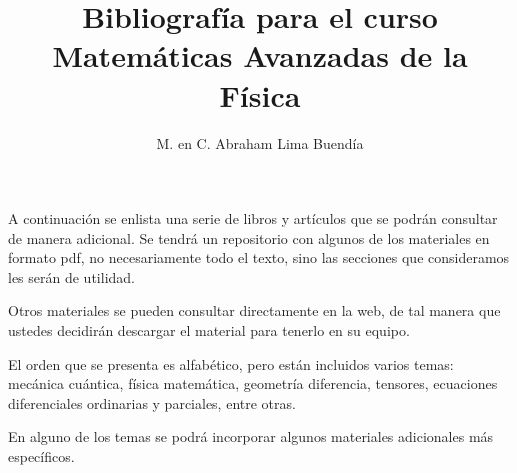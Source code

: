 
\usepackage{apacite}
\renewcommand{\refname}{Bibliografía.}
% 
\title{Bibliografía para el curso\\ \large{Matemáticas Avanzadas de la Física}\vspace{-3ex}}
\author{M. en C. Abraham Lima Buendía}
\date{}

\vspace{-4cm}
\maketitle
\fontsize{14}{14}\selectfont
A continuación se enlista una serie de libros y artículos que se podrán consultar de manera adicional. Se tendrá un repositorio con algunos de los materiales en formato pdf, no necesariamente todo el texto, sino las secciones que consideramos les serán de utilidad.
\par
Otros materiales se pueden consultar directamente en la web, de tal manera que ustedes decidirán descargar el material para tenerlo en su equipo.
\par
El orden que se presenta es alfabético, pero están incluidos varios temas: mecánica cuántica, física matemática, geometría diferencia, tensores, ecuaciones diferenciales ordinarias y parciales, entre otras.
\par
En alguno de los temas se podrá incorporar algunos materiales adicionales más específicos.

\nocite{*}


